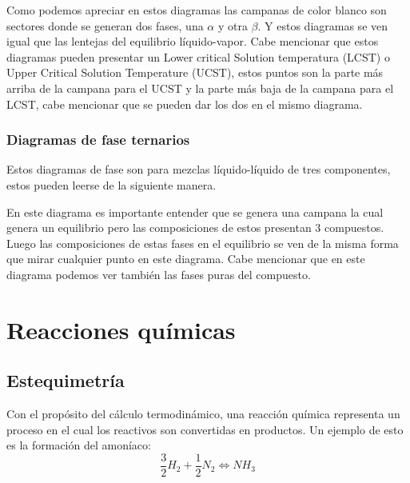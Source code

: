 
Como podemos apreciar en estos diagramas las campanas de color blanco son sectores donde se generan dos fases, una $\alpha$ y otra $\beta$. Y estos diagramas se ven igual que las lentejas del equilibrio líquido-vapor.
Cabe mencionar que estos diagramas pueden presentar un Lower critical Solution temperatura (LCST) o Upper Critical Solution Temperature (UCST), estos puntos son la parte más arriba de la campana para el UCST y la parte más baja de la campana para el LCST, cabe mencionar que se pueden dar los dos en el mismo diagrama.

\subsubsection{Diagramas de fase ternarios}

Estos diagramas de fase son para mezclas líquido-líquido de tres componentes, estos pueden leerse de la siguiente manera.


En este diagrama es importante entender que se genera una campana la cual genera un equilibrio pero las composiciones de estos presentan 3 compuestos. Luego las composiciones de estas fases en el equilibrio se ven de la misma forma que mirar cualquier punto en este diagrama.
Cabe mencionar que en este diagrama podemos ver también las fases puras del compuesto.

\clearpage
\section{Reacciones químicas}
\subsection{Estequimetría}
Con el propósito del cálculo termodinámico, una reacción química representa un proceso en el cual los reactivos son convertidas en productos. Un ejemplo de esto es la formación del amoníaco:
\begin{equation}
    \frac{3}{2}H_2+\frac{1}{2}N_2\Leftrightarrow NH_3
\end{equation}

